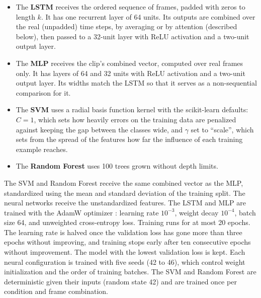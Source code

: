 \begin{itemize}
   \item The \textbf{LSTM} \cite{hochreiter1997} receives the ordered sequence of frames, padded with zeros to length $k$. It has one recurrent layer of 64 units. Its outputs are combined over the real (unpadded) time steps, by averaging or by attention (described below), then passed to a 32-unit layer with ReLU activation and a two-unit output layer.
   \item The \textbf{MLP} receives the clip's combined vector, computed over real frames only. It has layers of 64 and 32 units with ReLU activation and a two-unit output layer. Its widths match the LSTM so that it serves as a non-sequential comparison for it.
   \item The \textbf{SVM} \cite{cortes1995} uses a radial basis function kernel with the scikit-learn defaults: $C = 1$, which sets how heavily errors on the training data are penalized against keeping the gap between the classes wide, and $\gamma$ set to ``scale'', which sets from the spread of the features how far the influence of each training example reaches.
   \item The \textbf{Random Forest} \cite{breiman2001} uses 100 trees grown without depth limits.
\end{itemize}

The SVM and Random Forest receive the same combined vector as the MLP, standardized using the mean and standard deviation of the training split. The neural networks receive the unstandardized features. The LSTM and MLP are trained with the AdamW optimizer \cite{loshchilov2019}: learning rate $10^{-3}$, weight decay $10^{-4}$, batch size 64, and unweighted cross-entropy loss. Training runs for at most 20 epochs. The learning rate is halved once the validation loss has gone more than three epochs without improving, and training stops early after ten consecutive epochs without improvement. The model with the lowest validation loss is kept. Each neural configuration is trained with five seeds (42 to 46), which control weight initialization and the order of training batches. The SVM and Random Forest are deterministic given their inputs (random state 42) and are trained once per condition and frame combination.

